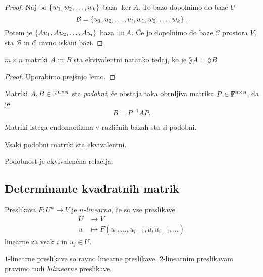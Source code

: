 \documentclass[12pt, a4paper]{article}
\begin{document}
\begin{proof}
Naj bo $\left\{w_1,w_2,\dots,w_k\right\}$ baza $\ker A$. To bazo dopolnimo do baze $U$
\[
\mathcal{B}=\left\{u_1,u_2,\dots,u_l,w_1,w_2,\dots,w_k\right\}.
\]
Potem je $\left\{Au_1,Au_2,\dots,Au_l\right\}$ baza $\operatorname{im} A$. Če jo dopolnimo do baze $\mathcal{C}$ prostora $V$, sta $\mathcal{B}$ in $\mathcal{C}$ ravno iskani bazi.
\end{proof}

\begin{izrek}
$m\times n$ matriki $A$ in $B$ sta ekvivalentni natanko tedaj, ko je $\rang A=\rang B$.
\end{izrek}

\begin{proof}
Uporabimo prejšnjo lemo.
\end{proof}

\begin{definicija}
Matriki $A,B\in\mathbb{F}^{n\times n}$ sta \emph{podobni}, če obstaja taka obrnljiva matrika $P\in\mathbb{F}^{n\times n}$, da je
\[
B=P^{-1}AP.
\]
\end{definicija}

\begin{opomba}
Matriki istega endomorfizma v različnih bazah sta si podobni.
\end{opomba}

\begin{opomba}
Vsaki podobni matriki sta ekvivalentni.
\end{opomba}

\begin{trditev}
Podobnost je ekvivalenčna relacija.
\end{trditev}

\obvs

\newpage

\subsection{Determinante kvadratnih matrik}

\begin{definicija}
Preslikava $F\colon U^n\to V$ je \emph{$n$-linearna}, če so vse preslikave
\begin{align*}
U&\to V
\\
u&\mapsto F(u_1,\dots,u_{i-1},u,u_{i+1},\dots)
\end{align*}
linearne za vsak $i$ in $u_j\in U$.
\end{definicija}

\begin{opomba}
$1$-linearne preslikave so ravno linearne preslikave. $2$-linearnim preslikavam pravimo tudi \emph{bilinearne} preslikave.
\end{opomba}
\end{document}
